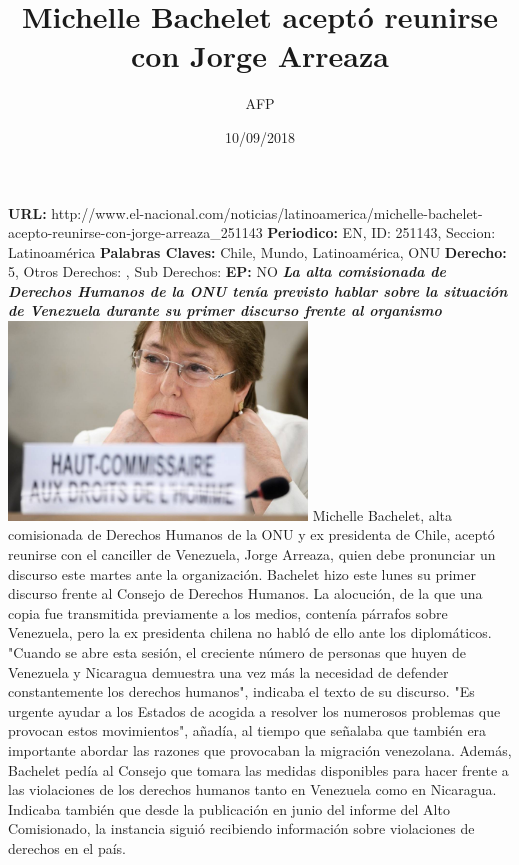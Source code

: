\documentclass{article}%
\title{\textbf{Michelle Bachelet aceptó reunirse con Jorge Arreaza}}%
\author{AFP}%
\date{10/09/2018}%
\begin{document}
%
\normalsize%
\maketitle%
\textbf{URL: }%
http://www.el{-}nacional.com/noticias/latinoamerica/michelle{-}bachelet{-}acepto{-}reunirse{-}con{-}jorge{-}arreaza\_251143\newline%
%
\textbf{Periodico: }%
EN, %
ID: %
251143, %
Seccion: %
Latinoamérica\newline%
%
\textbf{Palabras Claves: }%
Chile, Mundo, Latinoamérica, ONU\newline%
%
\textbf{Derecho: }%
5, %
Otros Derechos: %
, %
Sub Derechos: %
\newline%
%
\textbf{EP: }%
NO\newline%
\newline%
%
\textbf{\textit{La alta comisionada de Derechos Humanos de la ONU tenía previsto hablar sobre la situación de Venezuela durante su primer discurso frente al organismo}}%
\newline%
\newline%
%
\includegraphics[width=300px]{203.jpg}%
\newline%
%
Michelle Bachelet, alta comisionada de Derechos Humanos de la ONU y ex presidenta de Chile, aceptó reunirse con el canciller de Venezuela, Jorge Arreaza, quien debe pronunciar un discurso este martes ante la organización.%
\newline%
%
Bachelet hizo este lunes su primer discurso frente al Consejo de Derechos Humanos. La alocución, de la que una copia fue transmitida previamente a los medios, contenía párrafos sobre Venezuela, pero la ex presidenta chilena no habló de ello ante los diplomáticos.%
\newline%
%
"Cuando se abre esta sesión, el creciente número de personas que huyen de Venezuela y Nicaragua demuestra una vez más la necesidad de defender constantemente los derechos humanos", indicaba el texto de su discurso.%
\newline%
%
"Es urgente ayudar a los Estados de acogida a resolver los numerosos problemas que provocan estos movimientos", añadía, al tiempo que señalaba que también era importante abordar las razones que provocaban la migración venezolana.%
\newline%
%
Además, Bachelet pedía al Consejo que tomara las medidas disponibles para hacer frente a las violaciones de los derechos humanos tanto en Venezuela como en Nicaragua.%
\newline%
%
Indicaba también que desde la publicación en junio del informe del Alto Comisionado, la instancia siguió recibiendo información sobre violaciones de derechos en el país.%
\newline%
%
\end{document}
